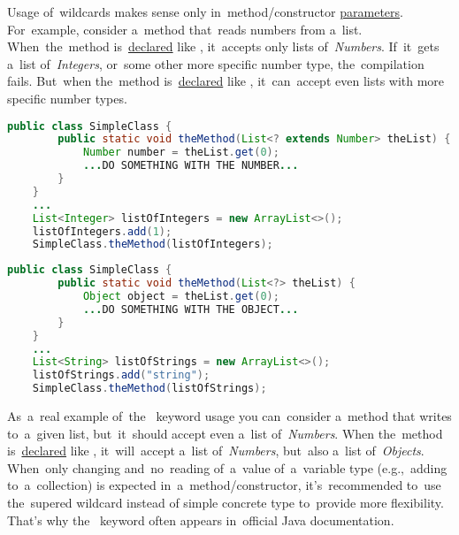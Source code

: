 Usage of~wildcards makes sense only in~method/constructor \hyperref[parameterargument]{parameters}.
For~example, consider a~method that~reads numbers from a~list.
When~the~method is~\hyperref[declarationdefinition]{declared} like , it~accepts only lists \mbox{of \textit{Numbers}}.
If~it~gets a~list \mbox{of \textit{Integers}},  or~some other more specific number type, the~compilation fails.
But~when the~method is~\hyperref[declarationdefinition]{declared} like , it~can~accept even lists with more specific number types.
\newpage

\begin{lstlisting}[language=Java]
    public class SimpleClass {
        public static void theMethod(List<? extends Number> theList) {
            Number number = theList.get(0);
            ...DO SOMETHING WITH THE NUMBER...
        }
    }
    ...
    List<Integer> listOfIntegers = new ArrayList<>();
    listOfIntegers.add(1);
    SimpleClass.theMethod(listOfIntegers);
\end{lstlisting}
\begin{lstlisting}[language=Java]
    public class SimpleClass {
        public static void theMethod(List<?> theList) {
            Object object = theList.get(0);
            ...DO SOMETHING WITH THE OBJECT...
        }
    }
    ...
    List<String> listOfStrings = new ArrayList<>();
    listOfStrings.add("string");
    SimpleClass.theMethod(listOfStrings);
\end{lstlisting}
\newline

\noindent As~a~real example \mbox{of the } keyword usage you can~consider a~method that writes  to~a~given list, but~it~should accept even a~list \mbox{of \textit{Numbers}}.
When the~method is~\hyperref[declarationdefinition]{declared} like , it~will~accept a~list \mbox{of \textit{Numbers}}, but~also a~list \mbox{of \textit{Objects}}.
When~only changing and~no~reading of~a~value of~a~variable type (e.g.,~adding to~a~collection) is expected in~a~method/constructor, it's~recommended to~use the~supered wildcard instead of simple concrete type to~provide more flexibility.
That's why the~ keyword often appears in~official Java documentation.
\newpage

